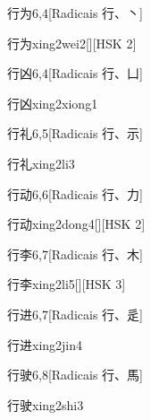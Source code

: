 \begin{entry}{行为}{6,4}[Radicais ⾏、⼂]
  \begin{phonetics}{行为}{xing2wei2}[][HSK 2]
  \end{phonetics}
\end{entry}

\begin{entry}{行凶}{6,4}[Radicais ⾏、⼐]
  \begin{phonetics}{行凶}{xing2xiong1}
  \end{phonetics}
\end{entry}

\begin{entry}{行礼}{6,5}[Radicais ⾏、⽰]
  \begin{phonetics}{行礼}{xing2li3}
  \end{phonetics}
\end{entry}

\begin{entry}{行动}{6,6}[Radicais ⾏、⼒]
  \begin{phonetics}{行动}{xing2dong4}[][HSK 2]
  \end{phonetics}
\end{entry}

\begin{entry}{行李}{6,7}[Radicais ⾏、⽊]
  \begin{phonetics}{行李}{xing2li5}[][HSK 3]
  \end{phonetics}
\end{entry}

\begin{entry}{行进}{6,7}[Radicais ⾏、⾡]
  \begin{phonetics}{行进}{xing2jin4}
  \end{phonetics}
\end{entry}

\begin{entry}{行驶}{6,8}[Radicais ⾏、⾺]
  \begin{phonetics}{行驶}{xing2shi3}
  \end{phonetics}
\end{entry}

